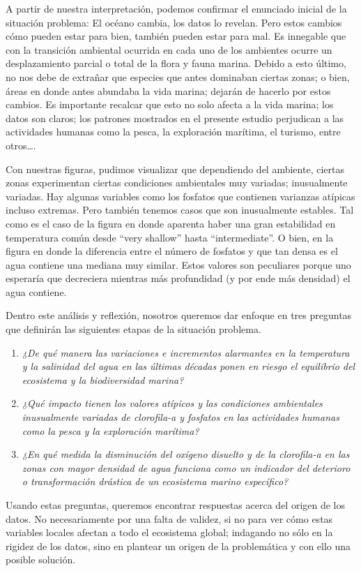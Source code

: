 A partir de nuestra interpretación, podemos confirmar el enunciado inicial de la situación problema: El océano cambia, los datos lo revelan. Pero estos cambios cómo pueden estar para bien, también pueden estar para mal. Es innegable que con la transición ambiental ocurrida en cada uno de los ambientes ocurre un desplazamiento parcial o total de la flora y fauna marina. Debido a esto último, no nos debe de extrañar que especies que antes dominaban ciertas zonas; o bien, áreas en donde antes abundaba la vida marina; dejarán de hacerlo por estos cambios. Es importante recalcar que esto no solo afecta a la vida marina; los datos son claros; los patrones mostrados en el presente estudio perjudican a las actividades humanas como la pesca, la exploración marítima, el turismo, entre otros….

Con nuestras figuras, pudimos visualizar que dependiendo del ambiente, ciertas zonas experimentan ciertas condiciones ambientales muy variadas; inusualmente variadas. Hay algunas variables como los fosfatos que contienen varianzas atípicas incluso extremas. Pero también tenemos casos que son inusualmente estables. Tal como es el caso de la figura en donde aparenta haber una gran estabilidad en temperatura común desde “very shallow” hasta “intermediate”. O bien, en la figura en donde la diferencia entre el número de fosfatos y que tan densa es el agua contiene una mediana muy similar. Estos valores son peculiares porque uno esperaría que decreciera mientras más profundidad (y por ende más densidad) el agua contiene. 

Dentro este análisis y reflexión, nosotros queremos dar enfoque en tres preguntas que definirán las siguientes etapas de la situación problema.

\begin{enumerate}
    \item \textit{¿De qué manera las variaciones e incrementos alarmantes en la temperatura y la salinidad del agua en las últimas décadas ponen en riesgo el equilibrio del ecosistema y la biodiversidad marina?}
    \item \textit{¿Qué impacto tienen los valores atípicos y las condiciones ambientales inusualmente variadas de clorofila-a y fosfatos en las actividades humanas como la pesca y la exploración marítima?}
    \item \textit{¿En qué medida la disminución del oxígeno disuelto y de la clorofila-a en las zonas con mayor densidad de agua funciona como un indicador del deterioro o transformación drástica de un ecosistema marino específico?}
\end{enumerate}

Usando estas preguntas, queremos encontrar respuestas acerca del origen de los datos. No necesariamente por una falta de validez, si no para ver cómo estas variables locales afectan a todo el ecosistema global; indagando no sólo en la rigidez de los datos, sino en plantear un origen de la problemática y con ello una posible solución.
